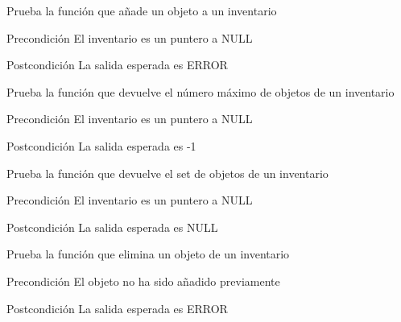 \begin{DoxyRefList}
\item[\label{test__test000116}%
\hypertarget{test__test000116}{}%
Global \hyperlink{inventory__test_8c_aa71b62b43df77830d47caa4237ee76a2}{test2\-\_\-inventory\-\_\-add\-\_\-object} ()]Prueba la función que añade un objeto a un inventario \begin{DoxyPrecond}{Precondición}
El inventario es un puntero a N\-U\-L\-L 
\end{DoxyPrecond}
\begin{DoxyPostcond}{Postcondición}
La salida esperada es E\-R\-R\-O\-R  
\end{DoxyPostcond}

\item[\label{test__test000122}%
\hypertarget{test__test000122}{}%
Global \hyperlink{inventory__test_8c_abddcab377edb21235d6746668597fde2}{test2\-\_\-inventory\-\_\-get\-\_\-max} ()]Prueba la función que devuelve el número máximo de objetos de un inventario \begin{DoxyPrecond}{Precondición}
El inventario es un puntero a N\-U\-L\-L 
\end{DoxyPrecond}
\begin{DoxyPostcond}{Postcondición}
La salida esperada es -\/1  
\end{DoxyPostcond}

\item[\label{test__test000127}%
\hypertarget{test__test000127}{}%
Global \hyperlink{inventory__test_8c_a66737b763a088f8a85549e846b01fbdb}{test2\-\_\-inventory\-\_\-get\-\_\-set} ()]Prueba la función que devuelve el set de objetos de un inventario \begin{DoxyPrecond}{Precondición}
El inventario es un puntero a N\-U\-L\-L 
\end{DoxyPrecond}
\begin{DoxyPostcond}{Postcondición}
La salida esperada es N\-U\-L\-L  
\end{DoxyPostcond}

\item[\label{test__test000124}%
\hypertarget{test__test000124}{}%
Global \hyperlink{inventory__test_8c_a4ea1bbd9668f1049fb98590ffb0dd5db}{test2\-\_\-inventory\-\_\-remove\-\_\-object} ()]Prueba la función que elimina un objeto de un inventario \begin{DoxyPrecond}{Precondición}
El objeto no ha sido añadido previamente 
\end{DoxyPrecond}
\begin{DoxyPostcond}{Postcondición}
La salida esperada es E\-R\-R\-O\-R  
\end{DoxyPostcond}


\end{DoxyRefList}
